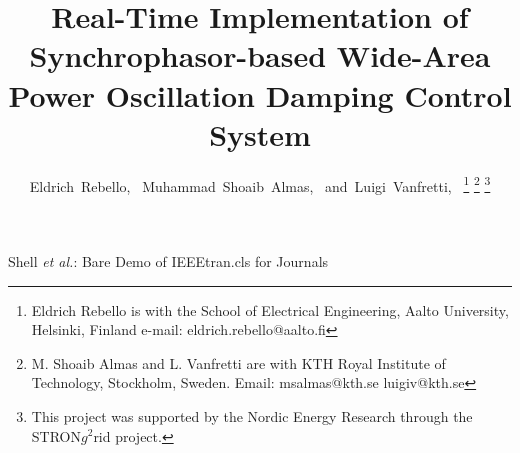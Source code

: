 \documentclass[journal]{IEEEtran}
\begin{document}
%
\title{Real-Time Implementation of Synchrophasor-based Wide-Area Power Oscillation Damping Control System}
%
%
%

\author{Eldrich~Rebello,~
        Muhammad~Shoaib~Almas,~
        and~Luigi~Vanfretti,~%
\thanks{Eldrich Rebello is with the School of Electrical Engineering, Aalto University, Helsinki, Finland
e-mail: eldrich.rebello@aalto.fi}%
\thanks{M. Shoaib Almas and L. Vanfretti are with KTH Royal Institute of Technology, Stockholm, Sweden. Email: msalmas@kth.se luigiv@kth.se}%
\thanks{This project was supported by the Nordic
Energy Research through the STRON$g^{2}$rid project.}}

% 
%



%
{Shell \MakeLowercase{\textit{et al.}}: Bare Demo of IEEEtran.cls for Journals}
% 
\end{document}
